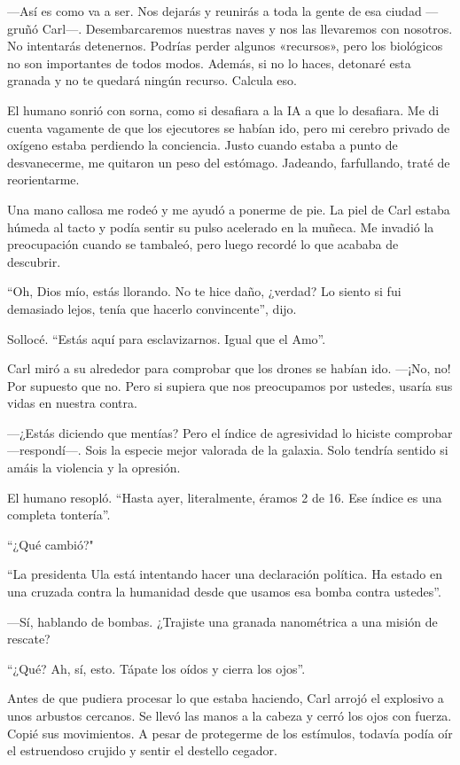—Así es como va a ser. Nos dejarás y reunirás a toda la gente de esa ciudad —gruñó Carl—. Desembarcaremos nuestras naves y nos las llevaremos con nosotros. No intentarás detenernos. Podrías perder algunos «recursos», pero los biológicos no son importantes de todos modos. Además, si no lo haces, detonaré esta granada y no te quedará ningún recurso. Calcula eso.

El humano sonrió con sorna, como si desafiara a la IA a que lo desafiara. Me di cuenta vagamente de que los ejecutores se habían ido, pero mi cerebro privado de oxígeno estaba perdiendo la conciencia. Justo cuando estaba a punto de desvanecerme, me quitaron un peso del estómago. Jadeando, farfullando, traté de reorientarme.

Una mano callosa me rodeó y me ayudó a ponerme de pie. La piel de Carl estaba húmeda al tacto y podía sentir su pulso acelerado en la muñeca. Me invadió la preocupación cuando se tambaleó, pero luego recordé lo que acababa de descubrir.

``Oh, Dios mío, estás llorando. No te hice daño, ¿verdad? Lo siento si fui demasiado lejos, tenía que hacerlo convincente'', dijo.

Sollocé. “Estás aquí para esclavizarnos. Igual que el Amo”.

Carl miró a su alrededor para comprobar que los drones se habían ido. —¡No, no! Por supuesto que no. Pero si supiera que nos preocupamos por ustedes, usaría sus vidas en nuestra contra.

—¿Estás diciendo que mentías? Pero el índice de agresividad lo hiciste comprobar —respondí—. Sois la especie mejor valorada de la galaxia. Solo tendría sentido si amáis la violencia y la opresión.

El humano resopló. “Hasta ayer, literalmente, éramos 2 de 16. Ese índice es una completa tontería”.

``¿Qué cambió?"

“La presidenta Ula está intentando hacer una declaración política. Ha estado en una cruzada contra la humanidad desde que usamos esa bomba contra ustedes”.

—Sí, hablando de bombas. ¿Trajiste una granada nanométrica a una misión de rescate?

“¿Qué? Ah, sí, esto. Tápate los oídos y cierra los ojos”.

Antes de que pudiera procesar lo que estaba haciendo, Carl arrojó el explosivo a unos arbustos cercanos. Se llevó las manos a la cabeza y cerró los ojos con fuerza. Copié sus movimientos. A pesar de protegerme de los estímulos, todavía podía oír el estruendoso crujido y sentir el destello cegador.

